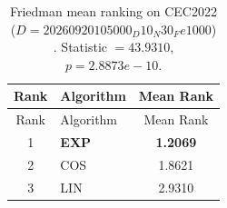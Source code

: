 \begin{center}
\small
\renewcommand{\arraystretch}{1.25}
\begin{longtable}{clc}
\caption{Friedman mean ranking on CEC2022 ($D=20260920105000_D10_N30_Fe1000$) . Statistic $=43.9310$, $p=2.8873e-10$.}
\label{tab:friedman_CEC2022_20260920105000_D10_N30_Fe1000} \\
\toprule
Rank & Algorithm & Mean Rank \\
\midrule
\endfirsthead
\toprule
Rank & Algorithm & Mean Rank \\
\midrule
\endhead
1 & \textbf{EXP} & \textbf{1.2069} \\
2 & COS & 1.8621 \\
3 & LIN & 2.9310 \\
\bottomrule
\end{longtable}
\end{center}
